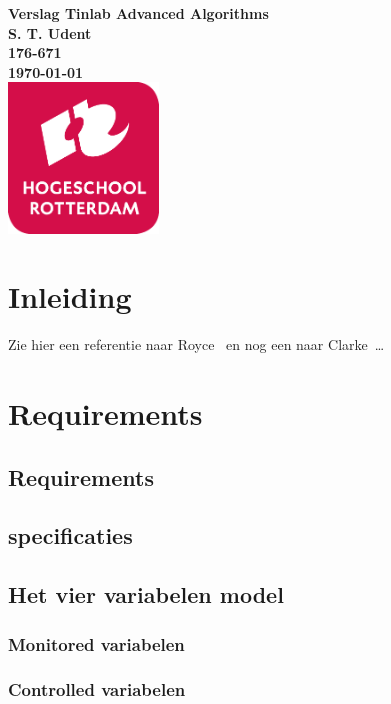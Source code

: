 \documentclass{article}
\begin{document}
\sffamily
\begin{titlepage}
  \centering
    \vfill
    {\bfseries\Huge
      Verslag Tinlab Advanced Algorithms \\
        \vskip2cm
      }
      {\bfseries\Large
        S. T. Udent\\
      }
      {
        \bfseries\normalsize
        176-671\\
        \vskip1cm
        \today\\
    }    
    \vfill
    \includegraphics[width=4cm]{logohr.png} %
    \vfill
    \vfill
\end{titlepage}
\newpage
\tableofcontents

\newpage
\section{Inleiding}
Zie hier een referentie naar Royce~\cite{royce1987managing} en nog een naar Clarke~\cite{modelchecking}\ldots 
\section{Requirements}

\subsection{Requirements}

\subsection{specificaties}

\subsection{Het vier variabelen model}
\subsubsection{Monitored variabelen}
\subsubsection{Controlled variabelen}
\end{document}
